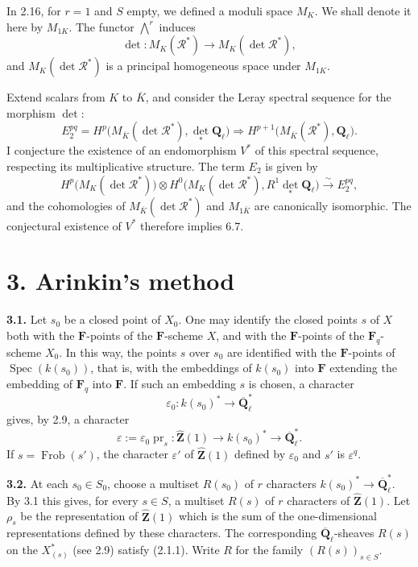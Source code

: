 \documentclass[11pt]{article}
\newcommand{\Fq}{\mathbf{F}_q}
\newcommand{\F}{\mathbf{F}}
\newcommand{\Qbl}{\overline{\mathbf{Q}}_{\ell}}
\newcommand{\Ql}{\mathbf{Q}_{\ell}}
\newcommand{\Spec}{\operatorname{Spec}}
\newcommand{\Frob}{\operatorname{Frob}}
\newcommand{\Zhat}{\widehat{\mathbf{Z}}}
\newcommand{\Rcal}{\mathcal{R}}
\newcommand{\para}[1]{\medskip\noindent\textbf{#1}\enspace}
\begin{document}
In 2.16, for \(r=1\) and \(S\) empty, we defined a moduli space \(M_K\). We shall denote it here by \(M_{1K}\). The functor \(\bigwedge^r\) induces
\begin{equation}
\det:M_K(\Rcal^*)\to M_K(\det\Rcal^*),
\tag{2.22.2}
\end{equation}
and \(M_K(\det\Rcal^*)\) is a principal homogeneous space under \(M_{1K}\).

Extend scalars from \(K\) to \(\overline K\), and consider the Leray spectral sequence for the morphism \(\det\):
\[
E_2^{pq}=H^p\bigl(M_{\overline K}(\det\Rcal^*),\det_*\Ql\bigr)\Rightarrow H^{p+1}\bigl(M_{\overline K}(\Rcal^*),\Ql\bigr).
\]
I conjecture the existence of an endomorphism \(V^*\) of this spectral sequence, respecting its multiplicative structure. The term \(E_2\) is given by
\[
H^p\bigl(M_K(\det\Rcal^*)\bigr)\otimes H^0\bigl(M_K(\det\Rcal^*),R^1\det_*\Ql\bigr)\xrightarrow{\sim} E_2^{pq},
\]
and the cohomologies of \(M_{\overline K}(\det\Rcal^*)\) and \(M_{1\overline K}\) are canonically isomorphic. The conjectural existence of \(V^*\) therefore implies 6.7.


\section*{3. Arinkin's method}
\para{3.1.} Let \(s_0\) be a closed point of \(X_0\). One may identify the closed points \(s\) of \(X\) both with the \(\F\)-points of the \(\F\)-scheme \(X\), and with the \(\F\)-points of the \(\Fq\)-scheme \(X_0\). In this way, the points \(s\) over \(s_0\) are identified with the \(\F\)-points of \(\Spec(k(s_0))\), that is, with the embeddings of \(k(s_0)\) into \(\F\) extending the embedding of \(\Fq\) into \(\F\). If such an embedding \(s\) is chosen, a character
\[
  \varepsilon_0:k(s_0)^*\longrightarrow \Qbl^*
\]
gives, by 2.9, a character
\[
  \varepsilon:=\varepsilon_0\operatorname{pr}_s:\Zhat(1)\longrightarrow k(s_0)^*\longrightarrow\Qbl^* .
\]
If \(s=\Frob(s')\), the character \(\varepsilon'\) of \(\Zhat(1)\) defined by \(\varepsilon_0\) and \(s'\) is \(\varepsilon^q\).

\para{3.2.} At each \(s_0\in S_0\), choose a multiset \(R(s_0)\) of \(r\) characters \(k(s_0)^*\to\Qbl^*\). By 3.1 this gives, for every \(s\in S\), a multiset \(R(s)\) of \(r\) characters of \(\Zhat(1)\). Let \(\rho_s\) be the representation of \(\Zhat(1)\) which is the sum of the one-dimensional representations defined by these characters. The corresponding \(\Qbl\)-sheaves \(R(s)\) on the \(X_{(s)}^*\) (see 2.9) satisfy (2.1.1). Write \(R\) for the family \((R(s))_{s\in S}\).
\end{document}
